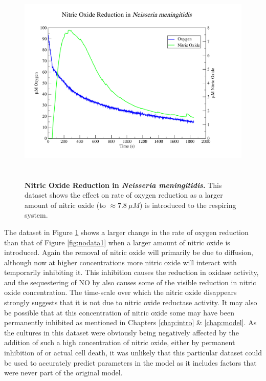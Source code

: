 \begin{figure}[tbp]
 \centering
 \includegraphics[height=10cm, trim=2cm 1cm 4cm 1cm]{./06-noreduction/data/aer-no-data2.pdf}
 \caption[{Nitric Oxide Reduction in \textit{Neisseria meningitidis}.}]{{\bf Nitric Oxide Reduction in \textit{Neisseria meningitidis}.} This dataset shows the effect on rate of oxygen reduction as a larger amount of nitric oxide (to $\approx 7.8~\mu M$) is introduced to the respiring system.}
 \label{fig:nodata2}
\end{figure}
The dataset in Figure \ref{fig:nodata2} shows a larger change in the rate of oxygen reduction than that of Figure \ref{fig:nodata1} when a larger amount of nitric oxide is introduced. Again the removal of nitric oxide will primarily be due to diffusion, although now at higher concentrations more nitric oxide will interact with \cbbthree{} temporarily inhibiting it. This inhibition causes the reduction in oxidase activity, and the sequestering of NO by \cbbthree{} also causes some of the visible reduction in nitric oxide concentration. The time-scale over which the nitric oxide disappears strongly suggests that it is not due to nitric oxide reductase activity. It may also be possible that at this concentration of nitric oxide some \cbbthree{} may have been permanently inhibited as mentioned in Chapters \ref{chap:intro} \& \ref{chap:model}. As the cultures in this dataset were obviously being negatively affected by the addition of such a high concentration of nitric oxide, either by permanent inhibition of \cbbthree{} or actual cell death, it was unlikely that this particular dataset could be used to accurately predict parameters in the model as it includes factors that were never part of the original model.

